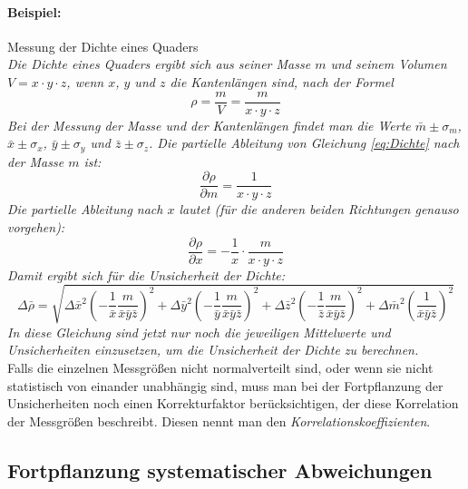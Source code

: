 \paragraph{Beispiel:} Messung der Dichte eines Quaders\\
\textit{
Die Dichte eines Quaders ergibt sich aus seiner Masse $m$ und seinem Volumen $V = x\cdot y\cdot z$, wenn $x$, $y$ und $z$ die Kantenlängen sind, nach der Formel
\begin{equation}
	\rho = \frac{m}{V} = \frac{m}{x\cdot y\cdot z}
	\label{eq:Dichte}
\end{equation}
Bei der Messung der Masse und der Kantenlängen findet man die Werte $\bar{m}\pm \sigma_m$, $\bar{x}\pm \sigma_x$, $\bar{y}\pm \sigma_y$ und $\bar{z}\pm \sigma_z$. Die partielle Ableitung von Gleichung \ref{eq:Dichte} nach der Masse $m$ ist:
\begin{equation*}
	\frac{\partial \rho}{\partial m} = \frac{1}{x\cdot y\cdot z}
\end{equation*}
Die partielle Ableitung nach $x$ lautet (für die anderen beiden Richtungen genauso vorgehen):
\begin{equation*}
	\frac{\partial \rho}{\partial x} = -\frac{1}{x}\cdot\frac{m}{x\cdot y\cdot z}
\end{equation*}
Damit ergibt sich für die Unsicherheit der Dichte:
\begin{equation}
	\Delta\bar{\rho} = \sqrt{\Delta\bar{x}^2\left(-\frac{1}{\bar{x}}\frac{m}{\bar{x}\bar{y}\bar{z}} \right)^2 + \Delta\bar{y}^2\left(-\frac{1}{\bar{y}}\frac{m}{\bar{x}\bar{y}\bar{z}} \right)^2 + \Delta\bar{z}^2\left(-\frac{1}{\bar{z}}\frac{m}{\bar{x}\bar{y}\bar{z}} \right)^2 + \Delta\bar{m}^2\left(\frac{1}{\bar{x}\bar{y}\bar{z}}\right)^2}
\end{equation}
In diese Gleichung sind jetzt nur noch die jeweiligen Mittelwerte und Unsicherheiten einzusetzen, um die Unsicherheit der Dichte zu berechnen.
}\\

Falls die einzelnen Messgrößen nicht normalverteilt sind, oder wenn sie nicht statistisch von einander unabhängig sind, muss man bei der Fortpflanzung der Unsicherheiten noch einen Korrekturfaktor berücksichtigen, der diese Korrelation der Messgrößen beschreibt. Diesen nennt man den \textit{Korrelationskoeffizienten}.

\subsection{Fortpflanzung systematischer Abweichungen}


